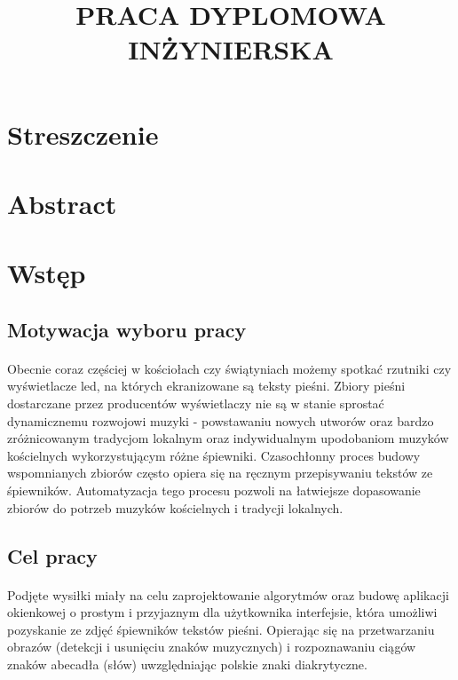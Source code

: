 \documentclass[a4paper,12pt]{article}
\begin{document}
	\title{PRACA DYPLOMOWA INŻYNIERSKA}
	\maketitle
	
	\newpage
	
	\setcounter{page}{2}
	\section*{Streszczenie}
	\section*{Abstract}

	\newpage 

	\section{Wstęp}
		\subsection{Motywacja wyboru pracy}
			\paragraph{\noindent} 
				Obecnie coraz częściej w kościo\l ach czy świątyniach możemy spotkać rzutniki czy wyświetlacze led, na których ekranizowane są teksty pieśni.
				Zbiory pieśni dostarczane przez producentów wyświetlaczy nie są w stanie sprostać dynamicznemu rozwojowi muzyki - powstawaniu nowych utworów
				oraz bardzo zróżnicowanym tradycjom lokalnym oraz indywidualnym upodobaniom muzyków kościelnych wykorzystującym różne śpiewniki.
				Czasochłonny proces budowy wspomnianych zbiorów często opiera się na ręcznym przepisywaniu tekstów ze śpiewników.
				Automatyzacja tego procesu pozwoli na łatwiejsze dopasowanie zbiorów do potrzeb muzyków kościelnych i tradycji lokalnych. 

		\subsection{Cel pracy}
			\paragraph{\noindent}
				Podjęte wysiłki miały na celu zaprojektowanie algorytmów oraz budowę aplikacji okienkowej o prostym i przyjaznym dla użytkownika interfejsie, która umożliwi pozyskanie ze zdjęć śpiewników tekstów pieśni.
				Opierając się na przetwarzaniu obrazów (detekcji i usunięciu znaków muzycznych) i rozpoznawaniu ciągów znaków abecadła (słów) uwzględniając polskie znaki diakrytyczne.
\end{document}
